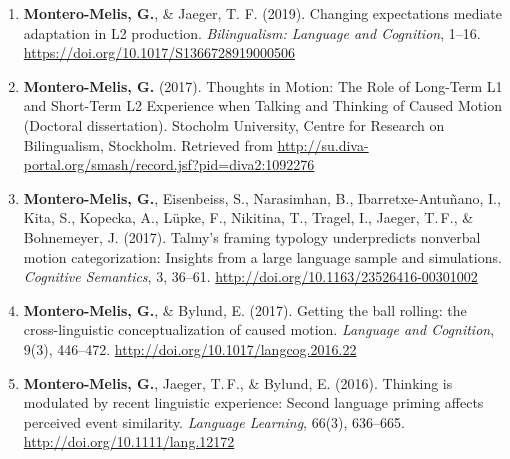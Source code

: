 \documentclass[margin, 11pt]{res} %
\begin{document}
\begin{resume}


\begin{enumerate}

	\item \textbf{Montero-Melis, G.}, \& Jaeger, T. F. (2019). Changing expectations mediate adaptation in L2 production. \emph{Bilingualism: Language and Cognition}, 1–16. \url{https://doi.org/10.1017/S1366728919000506}


	
	\item \textbf{Montero-Melis, G.} (2017). Thoughts in Motion: The Role of Long-Term L1 and Short-Term L2 Experience when Talking and Thinking of Caused Motion (Doctoral dissertation). Stocholm University, Centre for Research on Bilingualism, Stockholm. Retrieved from \url{http://su.diva-portal.org/smash/record.jsf?pid=diva2:1092276}

	\item \textbf{Montero-Melis, G.}, Eisenbeiss, S., Narasimhan, B., Ibarretxe-Antu\~{n}ano, I., Kita, S., Kopecka, A., L{\"u}pke, F., Nikitina, T., Tragel, I., Jaeger, T.\,F., \& Bohnemeyer, J. (2017). Talmy's framing typology underpredicts nonverbal motion categorization: Insights from a large language sample and simulations. \emph{Cognitive Semantics}, 3, 36--61. \url{http://doi.org/10.1163/23526416-00301002}

	\item \textbf{Montero-Melis, G.}, \& Bylund, E. (2017). Getting the ball rolling: the cross-linguistic conceptualization of caused motion. \emph{Language and Cognition}, 9(3), 446--472. \url{http://doi.org/10.1017/langcog.2016.22}

	\item \textbf{Montero-Melis, G.}, Jaeger, T.\,F., \& Bylund, E. (2016). Thinking is modulated by recent linguistic experience: Second language priming affects perceived event similarity. \emph{Language Learning}, 66(3), 636--665. \url{http://doi.org/10.1111/lang.12172}


\end{enumerate}
\end{resume}
\end{document}

